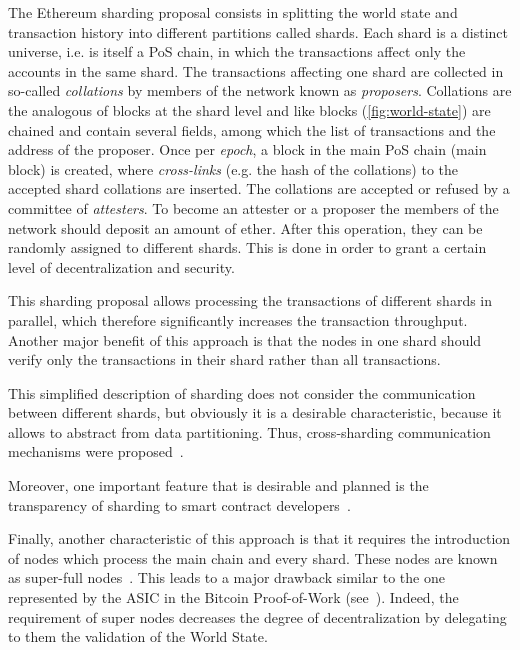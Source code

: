 The Ethereum sharding proposal consists in splitting the world state and
transaction history into different partitions called shards. Each shard is a
distinct universe, i.e. is itself a PoS chain, in which the transactions affect
only the accounts in the same shard. The transactions affecting one shard are
collected in so-called \emph{collations} by members of the network known as
\emph{proposers}. Collations are the analogous of blocks at the shard level and
like blocks (\autoref{fig:world-state}) are chained and contain several fields,
among which the list of transactions and the address of the proposer. Once per
\emph{epoch}, a block in the main PoS chain (main block) is created, where
\emph{cross-links} (e.g. the hash of the collations) to the accepted shard
collations are inserted. The collations are accepted or refused by a committee
of \emph{attesters}. To become an attester or a proposer the members of the
network should deposit an amount of ether. After this operation, they can be
randomly assigned to different shards. This is done in order to grant a certain
level of decentralization and security.


This sharding proposal allows processing the transactions of different shards in
parallel, which therefore significantly increases the transaction throughput.
Another major benefit of this approach is that the nodes in one shard should
verify only the transactions in their shard rather than all
transactions.

This simplified description of sharding does not consider the communication
between different shards, but obviously it is a desirable characteristic,
because it allows to abstract from data partitioning.
Thus, cross-sharding communication mechanisms were
proposed~\cite{bib:sharding-faq}.

Moreover, one important feature that is desirable and planned is the
transparency of sharding to smart contract developers~\cite{bib:sharding-faq}.

Finally, another characteristic of this approach is that it requires the
introduction of nodes which process the main chain and every shard. These nodes
are known as super-full nodes~\cite{bib:sharding-faq}. This leads to a major
drawback similar to the one represented by the ASIC in the Bitcoin Proof-of-Work
(see~\cite{sec:pow}). Indeed, the requirement of super nodes decreases the
degree of decentralization by delegating to them the validation of the World State.